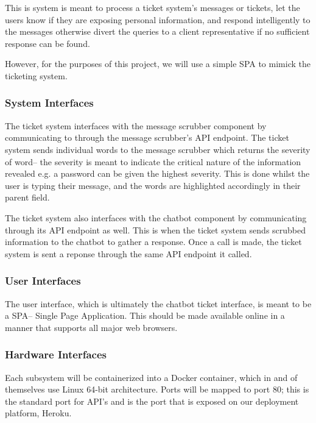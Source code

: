 \documentclass[11pt]{article}
\begin{document}
This is system is meant to process a ticket system's messages or tickets, let the users know if they are exposing personal information, and respond intelligently to the messages otherwise divert the queries to a client representative if no sufficient response can be found.\par

However, for the purposes of this project, we will use a simple SPA to mimick the ticketing system.

\subsubsection{System Interfaces}

The ticket system interfaces with the message scrubber component by communicating to through the message scrubber's API endpoint. The ticket system sends individual words to the message scrubber which returns the severity of word-- the severity is meant to indicate the critical nature of the information revealed e.g. a password can be given the highest severity. This is done whilst the user is typing their message, and the words are highlighted accordingly in their parent field.\par

The ticket system also interfaces with the chatbot component by communicating through its API endpoint as well. This is when the ticket system sends scrubbed information to the chatbot to gather a response. Once a call is made, the ticket system is sent a reponse through the same API endpoint it called.

\subsubsection{User Interfaces}

The user interface, which is ultimately the chatbot ticket interface, is meant to be a SPA-- Single Page Application. This should be made available online in a manner that supports all major web browsers.


\subsubsection{Hardware Interfaces}

Each subsystem will be containerized into a Docker container, which in and of themselves use Linux 64-bit architecture. 
Ports will be mapped to port 80; this is the standard port for API's and is the port that is exposed on our deployment platform, Heroku.
\end{document}
